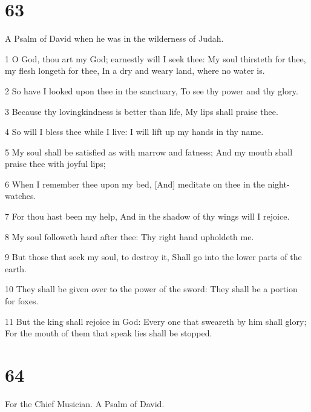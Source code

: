 \chapter{63}

\par A Psalm of David when he was in the wilderness of Judah.

\par 1 O God, thou art my God; earnestly will I seek thee: My soul thirsteth for thee, my flesh longeth for thee, In a dry and weary land, where no water is.
\par 2 So have I looked upon thee in the sanctuary, To see thy power and thy glory.
\par 3 Because thy lovingkindness is better than life, My lips shall praise thee.
\par 4 So will I bless thee while I live: I will lift up my hands in thy name.
\par 5 My soul shall be satisfied as with marrow and fatness; And my mouth shall praise thee with joyful lips;
\par 6 When I remember thee upon my bed, [And] meditate on thee in the night-watches.
\par 7 For thou hast been my help, And in the shadow of thy wings will I rejoice.
\par 8 My soul followeth hard after thee: Thy right hand upholdeth me.
\par 9 But those that seek my soul, to destroy it, Shall go into the lower parts of the earth.
\par 10 They shall be given over to the power of the sword: They shall be a portion for foxes.
\par 11 But the king shall rejoice in God: Every one that sweareth by him shall glory; For the mouth of them that speak lies shall be stopped.

\chapter{64}

\par For the Chief Musician. A Psalm of David.


